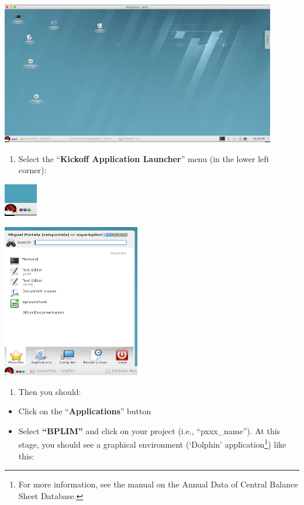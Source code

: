 \documentclass[]{book}
\providecommand{\tightlist}{%
  \setlength{\itemsep}{0pt}\setlength{\parskip}{0pt}}
\let\rmarkdownfootnote\footnote%
\def\footnote{\protect\rmarkdownfootnote}
\begin{document}
\includegraphics[width=4.72441in,height=2.44898in]{./media/image3.png}

\begin{enumerate}
\def\labelenumi{\arabic{enumi}.}
\setcounter{enumi}{3}
\tightlist
\item
  Select the ``\textbf{Kickoff Application Launcher}'' menu (in the lower left corner):
\end{enumerate}

\includegraphics[width=0.57067in,height=0.56371in]{./media/image4.png}

\includegraphics[width=2.3622in,height=2.63948in]{./media/image5.png}

\begin{enumerate}
\def\labelenumi{\arabic{enumi}.}
\setcounter{enumi}{4}
\tightlist
\item
  Then you should:
\end{enumerate}

\begin{itemize}
\tightlist
\item
  Click on the ``\textbf{Applications}'' button
\item
  Select \textbf{``BPLIM''} and click on your project (i.e., ``pxxx\_name''). At this stage, you should see a graphical environment (`Dolphin' application\footnote{For more information, see the manual on the Annual Data of Central Balance Sheet Database.}) like this:
\end{itemize}
\end{document}
